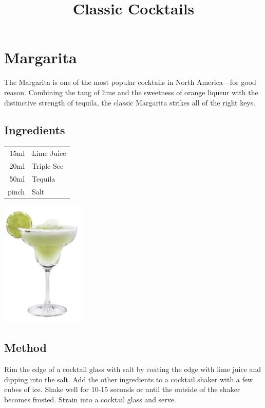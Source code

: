 \documentclass[12pt, letterpaper]{article}
\title{Classic Cocktails}
\begin{document}
\maketitle

\pagebreak
\section{Margarita}
The Margarita is one of the most popular cocktails in North America—for good reason.
Combining the tang of lime and the sweetness of orange liqueur with the distinctive strength of 
tequila, the classic Margarita strikes all of the right keys.

\subsection*{Ingredients}

\begin{multicols}{2}

\begin{tabular} { r | l}
    15ml & Lime Juice \\
    20ml & Triple Sec \\
    50ml & Tequila \\
    pinch & Salt
\end{tabular}

\includegraphics[height=6cm]{margarita}

\end{multicols}


\subsection*{Method}
Rim the edge of a cocktail glass with salt by coating the edge with lime juice and dipping into the salt.
Add the other ingredients to a cocktail shaker with a few cubes of ice.
Shake well for 10-15 seconds or until the outside of the shaker becomes frosted.
Strain into a cocktail glass and serve.
\end{document}
